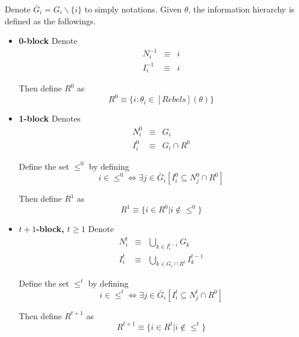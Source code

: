 \documentclass[12pt,letter]{article}
\theoremstyle{definition}
\theoremstyle{remark}
\theoremstyle{claim}
\begin{document}
Denote $\bar{G}_i=G_i\backslash \{i\}$ to simply notations. Given $\theta$, the information hierarchy is defined as the followings.
\begin{itemize}

\item \textbf{0-block}
Denote
\begin{eqnarray*}
N^{-1}_i &\equiv &  i \\
I^{-1}_i & \equiv & i
\end{eqnarray*}

Then define $R^0$ as 
\begin{equation}
R^0\equiv\{i:\theta_i\in[Rebels](\theta)\}
\end{equation}

\item \textbf{1-block}
Denotes
\begin{eqnarray*}
N^0_i &\equiv &  G_i \\
I^0_i & \equiv & G_i\cap R^0
\end{eqnarray*}

Define the set $\leq^0$ by defining
\begin{equation}i\in \leq^0 \Leftrightarrow \exists  j\in \bar{G}_i [I^0_i\subseteq N^0_j\cap R^0]\end{equation}  

Then define $R^1$ as 
\begin{equation}
R^{1} \equiv \{i\in R^0|i\notin \leq^0\}
\end{equation}

\item \textbf{$t+1$-block, $t\geq 1$}
Denote
\begin{eqnarray*}
N^t_i & \equiv & \bigcup_{k\in I^{t-1}_i}G_k \\
I^t_i & \equiv & \bigcup_{k\in G_i\cap R^t}I^{t-1}_k
\end{eqnarray*}


Define the set $\leq^t$ by defining
\begin{equation}i\in \leq^t \Leftrightarrow \exists j\in \bar{G}_i[I^t_i\subseteq N^t_j\cap R^0]\end{equation}

Then define $R^{t+1}$ as 
\begin{equation}
R^{t+1} \equiv  \{i\in R^t|i\notin \leq^t\}
\end{equation}


\end{itemize}
\end{document}
